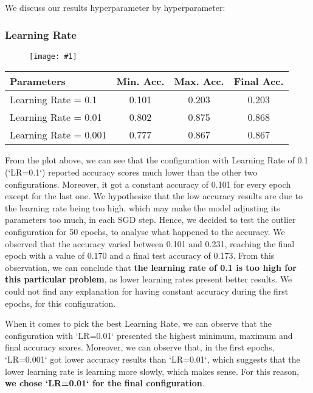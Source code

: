 \documentclass[10pt]{article}
\newcommand{\img}[1]{\begin{figure}[H]\centering\texttt{[image: \#1]}\end{figure}}
\begin{document}
We discuss our results hyperparameter by hyperparameter:

\subsubsection{Learning Rate}

\img{tuning/learning_rate.png}

\begin{center}
\begin{tabular}{||l|c|c|c||}
\hline
Parameters            & Min. Acc. & Max. Acc. & Final Acc. \\
\hline
\hline
Learning Rate = 0.1   & 0.101     & 0.203     & 0.203      \\
\hline
Learning Rate = 0.01  & 0.802     & 0.875     & 0.868      \\
\hline
Learning Rate = 0.001 & 0.777     & 0.867     & 0.867      \\
\hline
\end{tabular}
\end{center}

From the plot above, we can see that the configuration with Learning Rate of 0.1 (`LR=0.1`) reported accuracy scores much lower than the other two configurations.
Moreover, it got a constant accuracy of 0.101 for every epoch except for the last one.
We hypothesize that the low accuracy results are due to the learning rate being too high, which may make the model adjusting its parameters too much, in each SGD step.
Hence, we decided to test the outlier configuration for 50 epochs, to analyse what happened to the accuracy.
We observed that the accuracy varied between 0.101 and 0.231, reaching the final epoch with a value of 0.170 and a final test accuracy of 0.173.
From this observation, we can conclude that \textbf{the learning rate of 0.1 is too high for this particular problem}, as lower learning rates present better results.
We could not find any explanation for having constant accuracy during the first epochs, for this configuration.


When it comes to pick the best Learning Rate, we can observe that the configuration with `LR=0.01` presented the highest minimum, maximum and final accuracy scores.
Moreover, we can observe that, in the first epochs, `LR=0.001` got lower accuracy results than `LR=0.01`, which suggests that the lower learning rate is learning more slowly, which makes sense.
For this reason, \textbf{we chose `LR=0.01` for the final configuration}.
\end{document}
